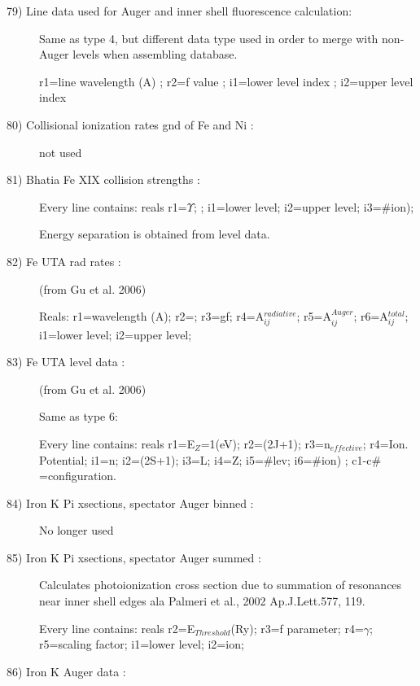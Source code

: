 \begin{description}
\item[79)  Line data used for Auger and inner shell fluorescence 
calculation:]  Same as type 4, but different data type used in order 
to merge with non-Auger levels when assembling database.
 
 r1=line wavelength (A)
; r2=f value
; i1=lower level index
; i2=upper level index



\item[80) Collisional ionization rates gnd of Fe and Ni :]

not used

\item[81) Bhatia Fe XIX collision strengths  :] 

Every line  contains:
 reals r1=$\Upsilon$; ;
i1=lower level; i2=upper level; i3=$\#$ion);

Energy separation is obtained from level data.

\item[82) Fe UTA rad rates  :]         

(from Gu et al. 2006)

Reals: r1=wavelength (A); r2=; r3=gf; r4=A$^{radiative}_{ij}$; 
r5=A$^{Auger}_{ij}$; r6=A$^{total}_{ij}$;
i1=lower level; i2=upper level;

\item[83) Fe UTA level data  :]                          

(from Gu et al. 2006)

 Same as type 6:
 
Every line  contains:
 reals r1=E$_Z$=1(eV); r2=(2J+1); r3=n$_{effective}$; r4=Ion. Potential;
i1=n; i2=(2S+1); i3=L; i4=Z; i5=$\#$lev; i6=$\#$ion)
; c1-c$\#$=configuration.


\item[84) Iron K Pi xsections, spectator Auger binned    :]

No longer used

\item[85) Iron K Pi xsections, spectator Auger summed    :]

Calculates photoionization cross section due to summation of 
resonances near inner shell edges ala Palmeri et al., 
2002 Ap.J.Lett.577, 119.

Every line  contains:
 reals r2=E$_{Threshold}$(Ry); r3=f parameter; r4=$\gamma$; r5=scaling factor;
i1=lower level; i2=ion;



\item[86) Iron K Auger data :]


\end{description}
